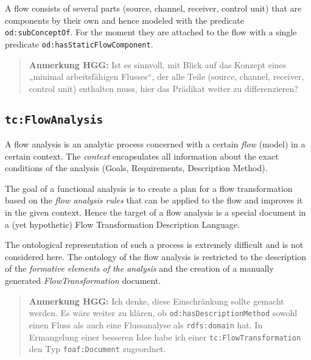 \documentclass[11pt,a4paper]{article}
\newcommand{\HGG}[1]{\begin{quote}\textbf{Anmerkung HGG:} #1\end{quote}}
\begin{document}
A flow consists of several parts (source, channel, receiver, control unit)
that are components by their own and hence modeled with the predicate
\texttt{od:subConceptOf}. For the moment they are attached to the flow with a
single predicate \texttt{od:hasStaticFlowComponent}.

\HGG{Ist es sinnvoll, mit Blick auf das Konzept eines „minimal arbeitsfähigen
  Flusses“, der alle Teile (source, channel, receiver, control unit) enthalten
  muss, hier das Prädikat weiter zu differenzieren?}

\subsection{\texttt{tc:FlowAnalysis}}

A flow analysis is an analytic process concerned with a certain \emph{flow}
(model) in a certain context.  The \emph{context} encapsulates all information
about the exact conditions of the analysis (Goals, Requirements, Description
Method).

The goal of a functional analysis is to create a plan for a flow
transformation based on the \emph{flow analysis rules} that can be applied to
the flow and improves it in the given context. Hence the target of a flow
analysis is a special document in a (yet hypothetic) Flow Transformation
Description Language.

The ontological representation of such a process is extremely difficult and is
not considered here. The ontology of the flow analysis is restricted to the
description of the \emph{formative elements of the analysis} and the creation
of a manually generated \emph{FlowTransformation} document.

\HGG{Ich denke, diese Einschränkung sollte gemacht werden. Es wäre weiter zu
  klären, ob \texttt{od:hasDescriptionMethod} sowohl einen Fluss als auch eine
Flussanalyse als \texttt{rdfs:domain} hat. In Ermangelung einer besseren Idee
habe ich einer \texttt{tc:FlowTransformation} den Typ \texttt{foaf:Document}
zugeordnet. }
\end{document}
